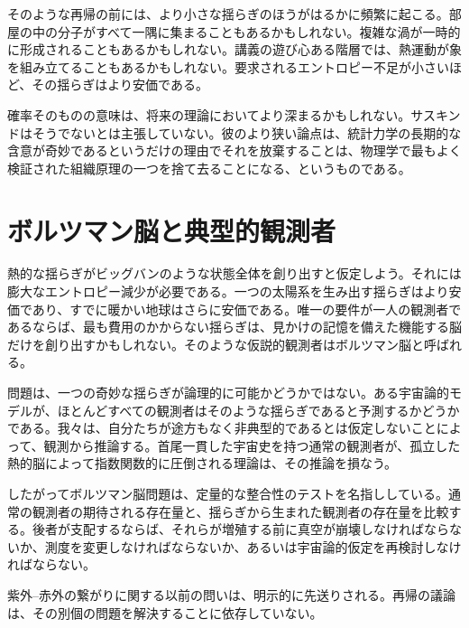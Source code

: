 そのような再帰の前には、より小さな揺らぎのほうがはるかに頻繁に起こる。部屋の中の分子がすべて一隅に集まることもあるかもしれない。複雑な渦が一時的に形成されることもあるかもしれない。講義の遊び心ある階層では、熱運動が象を組み立てることもあるかもしれない。要求されるエントロピー不足が小さいほど、その揺らぎはより安価である。

\begin{classroomqa}
\end{classroomqa}

確率そのものの意味は、将来の理論においてより深まるかもしれない。サスキンドはそうでないとは主張していない。彼のより狭い論点は、統計力学の長期的な含意が奇妙であるというだけの理由でそれを放棄することは、物理学で最もよく検証された組織原理の一つを捨て去ることになる、というものである。

\section{ボルツマン脳と典型的観測者}

熱的な揺らぎがビッグバンのような状態全体を創り出すと仮定しよう。それには膨大なエントロピー減少が必要である。一つの太陽系を生み出す揺らぎはより安価であり、すでに暖かい地球はさらに安価である。唯一の要件が一人の観測者であるならば、最も費用のかからない揺らぎは、見かけの記憶を備えた機能する脳だけを創り出すかもしれない。そのような仮説的観測者はボルツマン脳と呼ばれる。

問題は、一つの奇妙な揺らぎが論理的に可能かどうかではない。ある宇宙論的モデルが、ほとんどすべての観測者はそのような揺らぎであると予測するかどうかである。我々は、自分たちが途方もなく非典型的であるとは仮定しないことによって、観測から推論する。首尾一貫した宇宙史を持つ通常の観測者が、孤立した熱的脳によって指数関数的に圧倒される理論は、その推論を損なう。

したがってボルツマン脳問題は、定量的な整合性のテストを名指ししている。通常の観測者の期待される存在量と、揺らぎから生まれた観測者の存在量を比較する。後者が支配するならば、それらが増殖する前に真空が崩壊しなければならないか、測度を変更しなければならないか、あるいは宇宙論的仮定を再検討しなければならない。

紫外--赤外の繋がりに関する以前の問いは、明示的に先送りされる。再帰の議論は、その別個の問題を解決することに依存していない。

